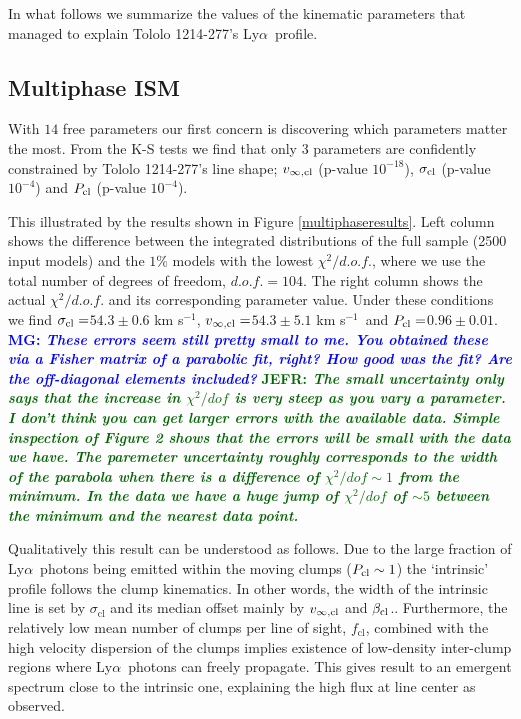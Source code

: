 \documentclass[a4,useAMS,usenatbib,usegraphicx]{mn2e}
\newcommand{\tol}{Tololo 1214-277}
\newcommand{\lya}{\ifmmode{{\rm Ly}\alpha}\else Ly$\alpha$\ \fi}
\newcommand{\sigmaclump}{$54.3\pm 0.6$ km s$^{-1}$}
\newcommand{\inftyclump}{$54.3\pm 5.1$ km s$^{-1}$}
\newcommand{\probaclump}{$0.96\pm 0.01$}
\newcommand{\mg}[1]{\textcolor{blue}{\bf MG: \textit{#1}}}
\newcommand{\jefr}[1]{\textcolor{darkgreen}{\bf JEFR: \textit{#1}}}
\begin{document}
In what follows we summarize the values of the kinematic parameters
that managed to explain \tol's \lya profile.


\subsection{Multiphase ISM}

With $14$ free parameters our first concern is discovering which 
parameters matter the most.
From the K-S tests we find that only 3 parameters 
are confidently constrained by \tol's line shape;
$v_{\infty,\rm{cl}}$ (p-value  $10^{-18}$), $\sigma_{\rm cl}$ (p-value
$10^{-4}$) and $P_{\rm cl}$ (p-value $10^{-4}$). 

This illustrated by the results shown in Figure \ref{multiphaseresults}.
Left column shows the difference between the integrated distributions
of the full sample (2500 input models) and the $1\%$ models with the lowest
$\chi^2/d.o.f.$, where we use the total number of degrees of freedom,
$d.o.f.=104$. 
The right column shows the actual $\chi^2/d.o.f.$ 
and its corresponding parameter value. 
Under these conditions we find $\sigma_{\rm cl}=$\sigmaclump,
$v_{\infty {\rm, cl}}=$\inftyclump\ and $P_{\rm cl}=$\probaclump.
\mg{These errors seem still pretty small to me. You obtained these via a Fisher matrix of a parabolic fit, right? How good was the fit? Are the off-diagonal elements included?}
\jefr{The small uncertainty only says that the increase in
  $\chi^2/dof$ is very steep as you vary a parameter. I don't think you can get larger errors
  with the available data. Simple inspection of Figure 2 shows
  that the errors will be small with the data we have. The
  paremeter uncertainty roughly corresponds to the width of the parabola
  when there is a difference of $\chi^2/dof\sim 1$ from the minimum. In the data we
  have a huge jump of $\chi^2/dof$ of $\sim 5$ between the minimum
  and the nearest data point. }

Qualitatively this result can be understood as follows.
Due to the large fraction of \lya photons being emitted within the
moving clumps ($P_{\rm cl}\sim 1$) the `intrinsic' profile follows 
the clump kinematics. In other words, the width of the intrinsic line
is set by $\sigma_{\mathrm{cl}}$ and its median offset mainly by
$v_{\infty,{\rm cl}}$ and $\beta_{\rm cl}$.. 
Furthermore, the relatively low mean number of clumps per line of
sight, $f_{\mathrm{cl}}$, combined with the high velocity dispersion
of the clumps implies existence of low-density inter-clump 
regions where \lya photons can freely propagate.
This gives result to an emergent spectrum close to the intrinsic one, explaining the high
flux at line center as observed.  
\end{document}
